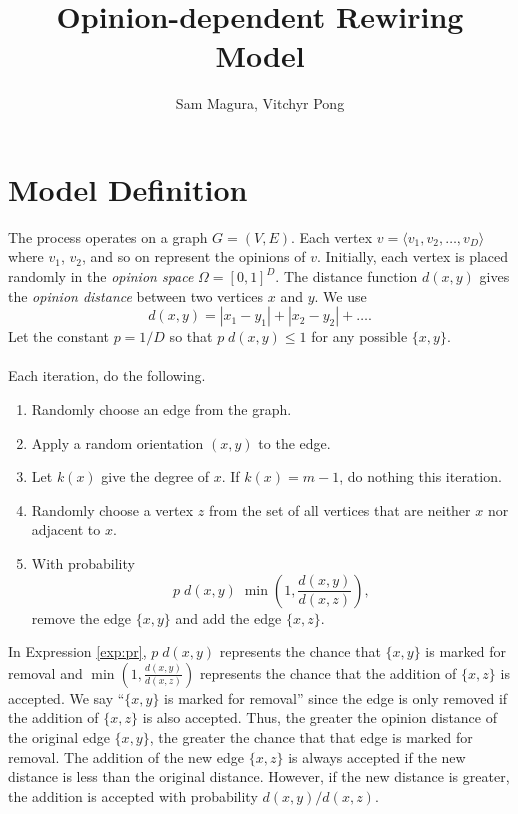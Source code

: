 \documentclass[a4paper,10pt]{article}
\title{Opinion-dependent Rewiring Model}
\author{Sam Magura, Vitchyr Pong}
\begin{document}
\maketitle
\section{Model Definition}
The process operates on a graph $G = (V, E)$. Each vertex $v = \langle v_1, v_2, \ldots, v_D \rangle$ where $v_1$, $v_2$, and so on represent the opinions of $v$. Initially, each vertex is placed randomly in the \emph{opinion space} $\Omega = [0, 1]^D$. The distance function $d(x, y)$ gives the \emph{opinion distance} between two vertices $x$ and $y$. We use
\begin{equation}
 d(x, y) = |x_1 - y_1| + |x_2 - y_2| + \ldots.
\end{equation}
Let the constant $p = 1 / D$ so that $p \; d(x, y) \leq 1$ for any possible $\{x, y\}$.  
\\\\Each iteration, do the following.
\begin{enumerate}
 \item Randomly choose an edge from the graph.
 \item Apply a random orientation $(x, y)$ to the edge.
 \item Let $k(x)$ give the degree of $x$. If $k(x) = m - 1$, do nothing this iteration.
 \item \label{item:z} Randomly choose a vertex $z$ from the set of all vertices that are neither $x$ nor adjacent to $x$.
 \item With probability
 \begin{equation}
 \label{exp:pr}
  p \; d(x, y) \; \min\left(1, \frac{d(x, y)}{d(x, z)}\right), 
 \end{equation}
remove the edge $\{x, y\}$ and add the edge $\{x, z\}$. 
\end{enumerate}
In Expression \ref{exp:pr}, $p \; d(x, y)$ represents the chance that $\{x, y\}$ is marked for removal and $\min(1, \frac{d(x, y)}{d(x, z)})$ represents the chance that the addition of $\{x, z\}$ is accepted. We say ``$\{x, y\}$ is marked for removal'' since the edge is only removed if the addition of $\{x, z\}$ is also accepted. Thus, the greater the opinion distance of the original edge $\{x, y\}$, the greater the chance that that edge is marked for removal. The addition of the new edge $\{x, z\}$ is always accepted if the new distance is less than the original distance. However, if the new distance is greater, the addition is accepted with probability $d(x, y) / d(x, z).$
\end{document}
